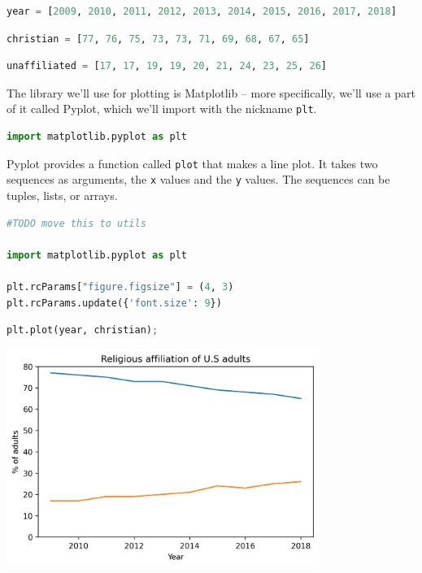 \begin{lstlisting}[language=Python,style=source]
year = [2009, 2010, 2011, 2012, 2013, 2014, 2015, 2016, 2017, 2018]
\end{lstlisting}

\begin{lstlisting}[language=Python,style=source]
christian = [77, 76, 75, 73, 73, 71, 69, 68, 67, 65]
\end{lstlisting}

\begin{lstlisting}[language=Python,style=source]
unaffiliated = [17, 17, 19, 19, 20, 21, 24, 23, 25, 26]
\end{lstlisting}

The library we'll use for plotting is Matplotlib -- more specifically,
we'll use a part of it called Pyplot, which we'll import with the
nickname \passthrough{\lstinline!plt!}.

\begin{lstlisting}[language=Python,style=source]
import matplotlib.pyplot as plt
\end{lstlisting}

Pyplot provides a function called \passthrough{\lstinline!plot!} that
makes a line plot. It takes two sequences as arguments, the
\passthrough{\lstinline!x!} values and the \passthrough{\lstinline!y!}
values. The sequences can be tuples, lists, or arrays.

\begin{lstlisting}[language=Python,style=source]
#TODO move this to utils

import matplotlib.pyplot as plt

plt.rcParams["figure.figsize"] = (4, 3)  
plt.rcParams.update({'font.size': 9})
\end{lstlisting}

\begin{lstlisting}[language=Python,style=source]
plt.plot(year, christian);
\end{lstlisting}

\begin{center}
\includegraphics[width=4in]{chapters/06_plotting_files/06_plotting_29_0.png}
\end{center}


